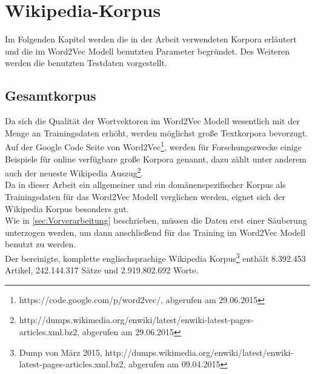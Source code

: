\documentclass[12pt,a4paper]{report}
\begin{document}
	
	
	

	
	
\newpage
\chapter{Wikipedia-Korpus}
Im Folgenden Kapitel werden die in der Arbeit verwendeten Korpora erläutert und die im Word2Vec Modell benutzten Parameter begründet. Des Weiteren werden die benutzten Testdaten vorgestellt.

	\section{Gesamtkorpus}
	\label{sec:Gesamtkorpus}
	Da sich die Qualität  der Wortvektoren im Word2Vec Modell wesentlich mit der Menge an Trainingsdaten erhöht\citep{DBLP:journals/corr/abs-1301-3781}, werden möglichst große Textkorpora bevorzugt. Auf der Google Code Seite von Word2Vec\footnote{https://code.google.com/p/word2vec/, abgerufen am 29.06.2015}, werden für Forschungszwecke einige Beispiele für online verfügbare große Korpora genannt, dazu zählt unter anderem auch der neueste Wikipedia Auszug\footnote{http://dumps.wikimedia.org/enwiki/latest/enwiki-latest-pages-articles.xml.bz2, abgerufen am 29.06.2015}.\\
	Da in dieser Arbeit ein allgemeiner und ein domänenspezifischer Korpus als Trainingsdaten für das Word2Vec Modell verglichen werden, eignet sich der Wikipedia Korpus besonders gut. \\
	Wie in \ref{sec:Vorverarbeitung} beschrieben, müssen die Daten erst einer Säuberung unterzogen werden, um dann anschließend für das Training im Word2Vec Modell benutzt zu werden.\\
	 Der bereinigte, komplette englischsprachige Wikipedia Korpus\footnote{Dump von März 2015, http://dumps.wikimedia.org/enwiki/latest/enwiki-latest-pages-articles.xml.bz2, abgerufen am 09.04.2015} enthält 8.392.453 Artikel, 242.144.317 Sätze und 2.919.802.692 Worte.\\
\end{document}
